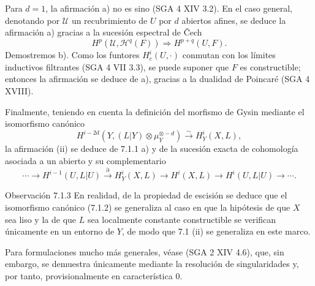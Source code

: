 Para $d=1$, la afirmación a) no es sino (SGA 4 XIV 3.2). En el caso general, denotando por $\mathcal U$ un recubrimiento de $U$ por $d$ abiertos afines, se deduce la afirmación a) gracias a la sucesión espectral de Čech
\[
H^p(\mathcal U,\mathcal H^q(F))\Rightarrow H^{p+q}(U,F).
\]
Demostremos b). Como los funtores $H_c^i(U,\cdot)$ conmutan con los límites inductivos filtrantes (SGA 4 VII 3.3), se puede suponer que $F$ es constructible; entonces la afirmación se deduce de a), gracias a la dualidad de Poincaré (SGA 4 XVIII).

Finalmente, teniendo en cuenta la definición del morfismo de Gysin mediante el isomorfismo canónico
\[
H^{i-2d}(Y,(L|Y)\otimes\mu_Y^{\otimes -d})\xrightarrow{\sim} H^i_Y(X,L),
\tag{7.1.2}
\]
la afirmación (ii) se deduce de 7.1.1 a) y de la sucesión exacta de cohomología asociada a un abierto y su complementario
\[
\cdots\to H^{i-1}(U,L|U)\xrightarrow{\partial}H^i_Y(X,L)\to H^i(X,L)\to H^i(U,L|U)\to\cdots .
\]

\begin{statement}{Observación 7.1.3}
En realidad, de la propiedad de escisión se deduce que el isomorfismo canónico (7.1.2) se generaliza al caso en que la hipótesis de que $X$ sea liso y la de que $L$ sea localmente constante constructible se verifican únicamente en un entorno de $Y$, de modo que 7.1 (ii) se generaliza en este marco.

Para formulaciones mucho más generales, véase (SGA 2 XIV 4.6), que, sin embargo, se demuestra únicamente mediante la resolución de singularidades y, por tanto, provisionalmente en característica $0$.
\end{statement}
